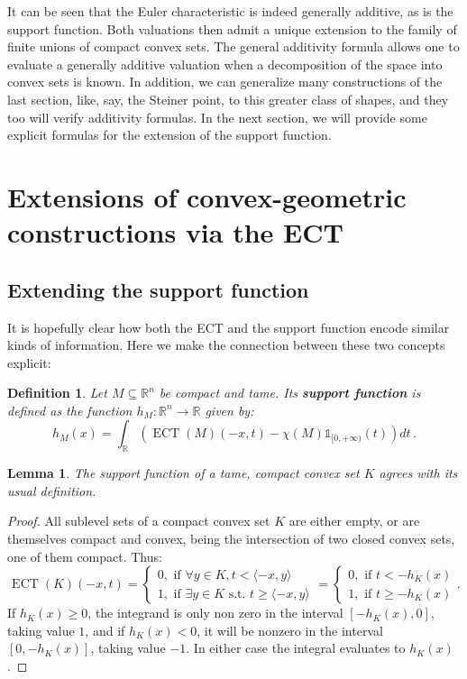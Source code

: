 \documentclass[a4paper]{article}
\newtheorem{lemma}[theorem]{Lemma}
\newtheorem{definition}[theorem]{Definition}
\newcommand{\ECT}{\operatorname{ECT}}
\newcommand{\bb}{\mathbb}
\begin{document}
It can be seen that the Euler characteristic is indeed generally additive, as is the support function. Both valuations then admit a unique extension to the family of finite unions of compact convex sets. The general additivity formula allows one to evaluate a generally additive valuation when a decomposition of the space into convex sets is known. In addition, we can generalize many constructions of the last section, like, say, the Steiner point, to this greater class of shapes, and they too will verify additivity formulas. In the next section, we will provide some explicit formulas for the extension of the support function.
	
\section{Extensions of convex-geometric constructions via the ECT}
\label{SectExt}
\subsection{Extending the support function}

It is hopefully clear how both the ECT and the support function encode similar kinds of information. Here we make the connection between these two concepts explicit:

\begin{definition}
	\label{DefSupport}
	Let $M\subseteq \bb R^n$ be compact and tame. Its \textbf{support function} is defined as the function $h_M: \bb R^n \to \bb R$ given by:
	\[ h_M(x)=\int_{\bb R} \left(\ECT(M)\left(-x,t\right)-\chi(M)\bb 1_{[0, +\infty)}(t)\right) dt\, .\]
\end{definition}

\begin{lemma}
	\label{SuppMatchesConvex}
	The support function of a tame, compact convex set $K$ agrees with its usual definition.
\end{lemma}
\begin{proof}
	All sublevel sets of a compact convex set $K$ are either empty, or are themselves compact and convex, being the intersection of two closed convex sets, one of them compact. Thus:
	\[\ECT(K)(-x,t)=\begin{cases}
		0, \text{ if } \forall y \in K, t< \langle -x, y \rangle \\
		1, \text{ if } \exists y \in K \text{ s.t. }t \geq \langle -x, y \rangle
	\end{cases}=\begin{cases}
		0, \text{ if } t< -h_K(x)  \\
		1, \text{ if } t\geq -h_K(x)
	\end{cases}.\]
	If $h_K(x)\geq 0$, the integrand is only non zero in the interval $[-h_K(x), 0]$, taking value $1$, and if $h_K(x)<0$, it will be nonzero in the interval $[0,-h_K(x)]$, taking value $-1$. In either case the integral evaluates to $h_K(x)$.
\end{proof}
\end{document}

